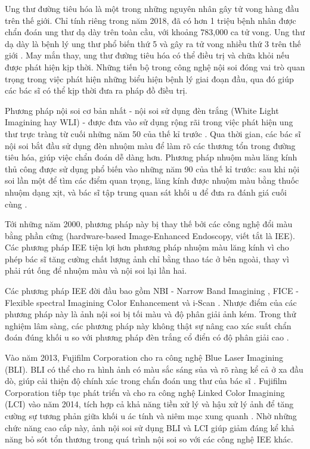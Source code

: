 \documentclass[12pt]{extreport}
\begin{document}
Ung thư đường tiêu hóa là một trong những nguyên nhân gây tử vong hàng đầu trên thế giới. Chỉ tính riêng trong năm 2018, đã có hơn 1 triệu bệnh nhân được chẩn đoán ung thư dạ dày trên toàn cầu, với khoảng 783,000 ca tử vong. Ung thư dạ dày là bệnh lý ung thư phổ biến thứ 5 và gây ra tử vong nhiều thứ 3 trên thế giới \cite{https://doi.org/10.3322/caac.21492}. May mắn thay, ung thư đường tiêu hóa có thể điều trị và chữa khỏi nếu được phát hiện kịp thời. Những tiến bộ trong công nghệ nội soi đóng vai trò quan trọng trong việc phát hiện những biểu hiện bệnh lý giai đoạn đầu, qua đó giúp các bác sĩ có thể kịp thời đưa ra pháp đồ điều trị.

Phương pháp nội soi cơ bản nhất - nội soi sử dụng đèn trắng (White Light Imagining hay WLI) - được đưa vào sử dụng rộng rãi trong việc phát hiện ung thư trực tràng từ cuối những năm 50 của thế kỉ trước \cite{pmid26668791}. Qua thời gian, các bác sĩ nội soi bắt đầu sử dụng đèn nhuộm màu để làm rõ các thương tổn trong đường tiêu hóa, giúp việc chẩn đoán dễ dàng hơn. Phương pháp nhuộm màu lăng kính thủ công được sử dụng phổ biến vào những năm 90 của thế kỉ trước: sau khi nội soi lần một để tìm các điểm quan trọng, lăng kính được nhuộm màu bằng thuốc nhuộm dạng xịt, và bác sĩ tập trung quan sát khối u để đưa ra đánh giá cuối cùng \cite{pmid10613481}.

Tới những năm 2000, phương pháp này bị thay thế bởi các công nghệ đổi màu bằng phần cứng (hardware-based Image-Enhanced Endoscopy, viết tắt là IEE). Các phương pháp IEE tiện lợi hơn phương pháp nhuộm màu lăng kính vì cho phép bác sĩ tăng cường chất lượng ảnh chỉ bằng thao tác ở bên ngoài, thay vì phải rút ống để nhuộm màu và nội soi lại lần hai.

Các phương pháp IEE đời đầu bao gồm NBI - Narrow Band Imagining \cite{pmid15578301}, FICE - Flexible spectral Imagining Color Enhancement \cite{TOGASHI2009734} và i-Scan \cite{HOFFMAN201045}. Nhược điểm của các phương pháp này là ảnh nội soi bị tối màu và độ phân giải ảnh kém. Trong thử nghiệm lâm sàng, các phương pháp này không thật sự nâng cao xác suất chẩn đoán đúng khối u so với phương pháp đèn trắng cổ điển có độ phân giải cao \cite{REX200742} \cite{pmid20628363}.

Vào năm 2013, Fujifilm Corporation cho ra công nghệ Blue Laser Imagining (BLI). BLI có thể cho ra hình ảnh có màu sắc sáng sủa và rõ ràng kể cả ở xa đầu dò, giúp cải thiện độ chính xác trong chẩn đoán ung thư của bác sĩ \cite{pmid24373002}. Fujifilm Corporation tiếp tục phát triển và cho ra công nghệ Linked Color Imagining (LCI) vào năm 2014, tích hợp cả khả năng tiền xử lý và hậu xử lý ảnh để tăng cường sự tương phản giữa khối u ác tính và niêm mạc xung quanh \cite{pmid30291440}. Nhờ những chức năng cao cấp này, ảnh nội soi sử dụng BLI và LCI giúp giảm đáng kể khả năng bỏ sót tổn thương trong quá trình nội soi so với các công nghệ IEE khác.
\end{document}

